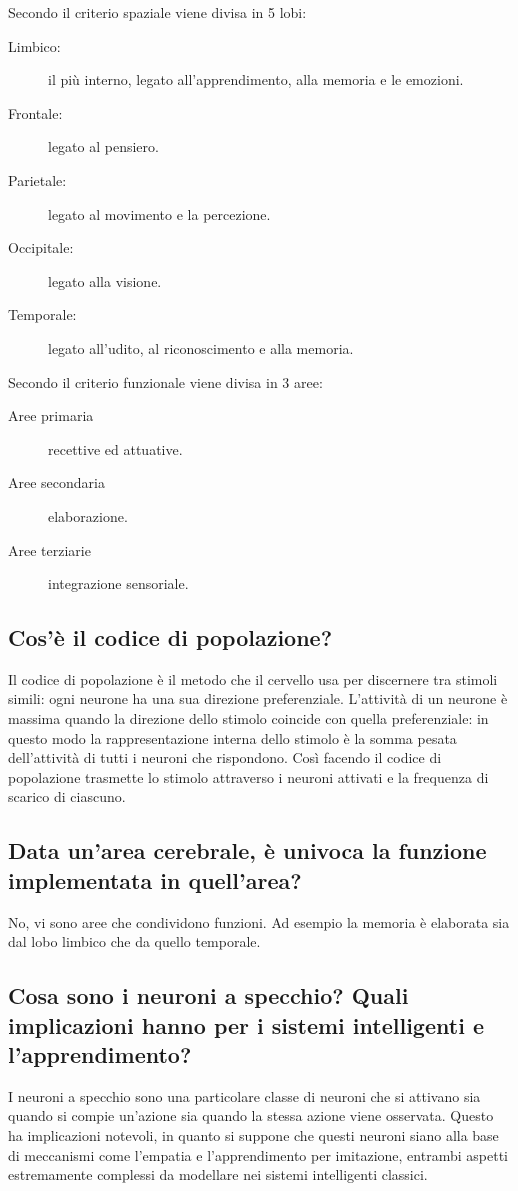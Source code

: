 \documentclass[\main/main.tex]{subfiles}
\begin{document}
Secondo il criterio spaziale viene divisa in 5 lobi:
\begin{description}
  \item[Limbico:] il più interno, legato all'apprendimento, alla memoria e le emozioni.
  \item[Frontale:] legato al pensiero.
  \item[Parietale:] legato al movimento e la percezione.
  \item[Occipitale:] legato alla visione.
  \item[Temporale:] legato all'udito, al riconoscimento e alla memoria.
\end{description}

Secondo il criterio funzionale viene divisa in 3 aree:
\begin{description}
  \item[Aree primaria] recettive ed attuative.
  \item[Aree secondaria] elaborazione.
  \item[Aree terziarie] integrazione sensoriale.
\end{description}

\subsection{Cos'è il codice di popolazione?}
Il codice di popolazione è il metodo che il cervello usa per discernere tra stimoli simili: ogni neurone ha una sua direzione preferenziale. L'attività di un neurone è massima quando la direzione dello stimolo coincide con quella preferenziale: in questo modo la rappresentazione interna dello stimolo è la somma pesata dell'attività di tutti i neuroni che rispondono. Così facendo il codice di popolazione trasmette lo stimolo attraverso i neuroni attivati e la frequenza di scarico di ciascuno.

\subsection{Data un'area cerebrale, è univoca la funzione implementata in quell'area?}
No, vi sono aree che condividono funzioni. Ad esempio la memoria è elaborata sia dal lobo limbico che da quello temporale.

\subsection{Cosa sono i neuroni a specchio? Quali implicazioni hanno per i sistemi intelligenti e l'apprendimento?}
I neuroni a specchio sono una particolare classe di neuroni che si attivano sia quando si compie un'azione sia quando la stessa azione viene osservata. Questo ha implicazioni notevoli, in quanto si suppone che questi neuroni siano alla base di meccanismi come l'empatia e l'apprendimento per imitazione, entrambi aspetti estremamente complessi da modellare nei sistemi intelligenti classici.
\end{document}
